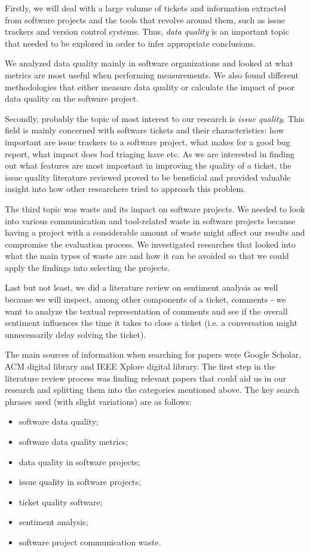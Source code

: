 \documentclass{mprop}
\begin{document}
Firstly, we will deal with a large volume of tickets and information extracted 
from software projects and the tools that revolve around them, such as issue 
trackers and version control systems. Thus, \emph{data quality} is an important 
topic that needed to be explored in order to infer appropriate conclusions. 

We analyzed data quality mainly in software organizations and looked at what metrics
are most useful when performing measurements. We also found different
methodologies that either measure data quality or calculate the impact of poor data
quality on the software project. 

Secondly, probably the topic of most interest to our research is \emph{issue quality}.
This field is mainly concerned with software tickets and their characteristics: how
important are issue trackers to a software project, what makes for a good bug report,
what impact does bad triaging have etc. As we are interested in finding out what
features are most important in improving the quality of a ticket, the issue quality
literature reviewed proved to be beneficial and provided valuable insight into
how other researchers tried to approach this problem.

The third topic was waste and its impact on software projects. We needed to
look into various communication and tool-related waste in software projects because
having a project with a considerable amount of waste might affect our results and
compromise the evaluation process. We investigated researches that looked into what
the main types of waste are and how it can be avoided so that
we could apply the findings into selecting the projects.

Last but not least, we did a literature review on sentiment analysis as well 
because we will inspect, among other components of a ticket, comments - we want 
to analyze the textual representation of comments and see if the overall 
sentiment influences the time it takes to close a ticket (i.e. a conversation
might unnecessarily delay solving the ticket).

The main sources of information when searching for papers were Google Scholar, 
ACM digital library and IEEE Xplore digital library. The first step in the 
literature review process was finding relevant papers that could aid us in
our research and splitting them into the categories mentioned above. The
key search phrases used (with slight variations) are as follows:
  \begin{itemize}
    \item software data quality;
    \item software data quality metrics;
    \item data quality in software projects;
    \item issue quality in software projects;
    \item ticket quality software;
    \item sentiment analysis;
    \item software project communication waste.
  \end{itemize}
\end{document}
